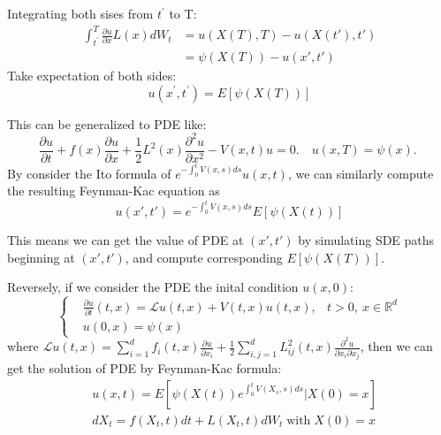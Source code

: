 Integrating both sises from $t^{\prime}$  to  T:
\begin{equation}
    \begin{aligned}
        \int_{t^{\prime}}^{T} \frac{\partial u}{\partial x} L(x) d W_{t} &= u(X(T), T) - u(X(t'), t')\\
        &= \psi(X(T)) - u(x', t')
    \end{aligned}
\end{equation}
Take expectation of both sides:
\begin{equation}
    u\left(x^{\prime}, t^{\prime}\right)=E[\psi(X(T))]
\end{equation}  
\begin{theorem}
    This can be generalized to PDE like:
\begin{equation}
    \frac{\partial u}{\partial t}+f(x) \frac{\partial u}{\partial x}+\frac{1}{2} L^{2}(x) \frac{\partial^{2} u}{\partial x^{2}}-V(x, t) u=0 . \quad u(x, T)=\psi(x) \text {. }
\end{equation}
By consider the Ito formula of $e^{-\int_0^t V(x, s) ds}u(x, t)$, we can similarly compute the resulting Feynman-Kac equation as 
\begin{equation}
    u(x', t') = e^{-\int_0^t V(x, s) ds}E\left[\psi(X(t))\right]
\end{equation}
\end{theorem}

This means we can get the value of PDE at $(x', t')$ by simulating SDE paths beginning at $(x', t')$, and compute corresponding $E\left[\psi(X(T))\right]$. 

Reversely, if we consider the PDE the inital condition $u(x, 0)$:
\begin{equation}\left\{
    \begin{aligned}
        &\frac{\partial u}{\partial t}(t,x) = \mathcal{L} u(t,x) + V(t,x) u(t,x), & t > 0,\ x \in \mathbb{R}^d \\
        &u(0,x) = \psi(x)
    \end{aligned}\right.
\end{equation}
where $\mathcal{L} u(t,x) = \sum_{i=1}^d f_i(t,x) \frac{\partial u}{\partial x_i} + \frac{1}{2} \sum_{i,j=1}^d L^2_{ij}(t,x) \frac{\partial^2 u}{\partial x_i \partial x_j}$, then we can get the solution of PDE by Feynman-Kac formula:
\begin{equation}
    \begin{aligned}
        &u(x, t) = E\left[\psi(X(t))e^{\int_0^t V(X_s, s) ds}|X(0)=x\right]\\
        &dX_t = f(X_t, t)dt + L(X_t, t)dW_t\operatorname{with}X(0)=x
    \end{aligned}
\end{equation}



